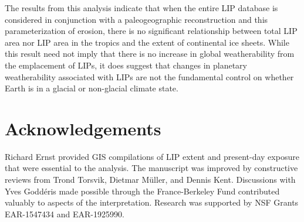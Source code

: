 The results from this analysis indicate that when the entire LIP database is considered in conjunction with a paleogeographic reconstruction and this parameterization of erosion, there is no significant relationship between total LIP area nor LIP area in the tropics and the extent of continental ice sheets. While this result need not imply that there is no increase in global weatherability from the emplacement of LIPs, it does suggest that changes in planetary weatherability associated with LIPs are not the fundamental control on whether Earth is in a glacial or non-glacial climate state.

\section{Acknowledgements}

Richard Ernst provided GIS compilations of LIP extent and present-day exposure that were essential to the analysis. The manuscript was improved by constructive reviews from Trond Torsvik, Dietmar Müller, and Dennis Kent. Discussions with Yves Godd\'eris made possible through the France-Berkeley Fund contributed valuably to aspects of the interpretation. Research was supported by NSF Grants EAR-1547434 and EAR-1925990.
